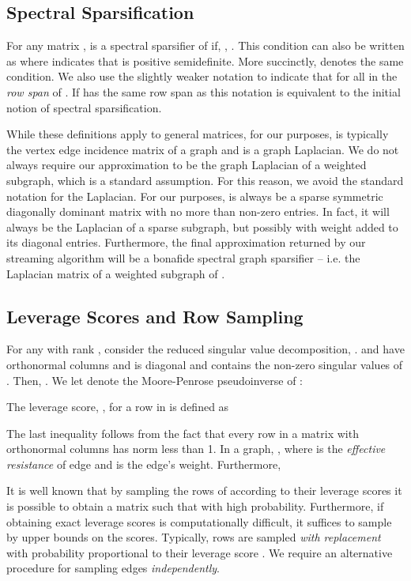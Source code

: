 \documentclass[11pt]{article}
\begin{document}
\subsection{Spectral Sparsification}
For any matrix ,  is a  spectral sparsifier of  if, , . This condition can also be written as  where  indicates that  is positive semidefinite. More succinctly,  denotes the same condition. 
We also use the slightly weaker notation  to indicate that  for all  in the \emph{row span} of . If  has the same row span as  this notation is equivalent to the initial notion of spectral sparsification.

While these definitions apply to general matrices, for our purposes,  is typically the vertex edge incidence matrix of a graph  and  is a graph Laplacian. We do not always require our approximation  to be the graph Laplacian of a weighted subgraph, which is a standard assumption. For this reason, we avoid the standard  notation for the Laplacian.  For our purposes,  is always be a sparse symmetric diagonally dominant matrix with no more than  non-zero entries. In fact, it will always be the Laplacian of a sparse subgraph, but possibly with weight added to its diagonal entries. Furthermore, the final approximation returned by our streaming algorithm will be a bonafide spectral graph sparsifier -- i.e. the Laplacian matrix of a weighted subgraph of .

\subsection{Leverage Scores and Row Sampling}
\label{Leverage Scores and Row Sampling}
For any  with rank , consider the reduced singular value decomposition, .  and  have orthonormal columns and  is diagonal and contains the non-zero singular values of . Then, . We let  denote the Moore-Penrose pseudoinverse of :

 The leverage score, , for a row  in  is defined as

The last inequality follows from the fact that every row in a matrix with orthonormal columns has norm less than 1. In a graph, , where  is the \emph{effective resistance} of edge  and  is the edge's weight. Furthermore,




It is well known that by sampling the rows of  according to their leverage scores it is possible to obtain a matrix  such that  with high probability. Furthermore, if obtaining exact leverage scores is computationally difficult, it suffices to sample by upper bounds on the scores. Typically, rows are sampled \emph{with replacement} with probability proportional to their leverage score \cite{graphSparsificationEffectiveResistance,pengV2}. We require an alternative procedure for sampling edges \emph{independently}.
\end{document}
